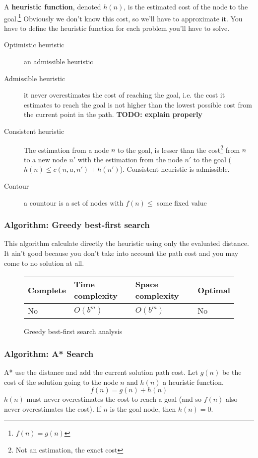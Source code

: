 A \textbf{heuristic function}, denoted $h(n)$, is the estimated cost of the node to the goal.\footnote{$f(n)=g(n)$} Obviously we don't know this cost, so we'll have to approximate it. You have to define the heuristic function for each problem you'll have to solve. 

\begin{description}
\item[Optimistic heuristic] an admissible heuristic
\item[Admissible heuristic] it never overestimates the cost of reaching the goal, i.e. the cost it estimates to reach the goal is not higher than the lowest possible cost from the current point in the path.\cite{wikiadmheur} \textbf{TODO: explain properly}
\item[Consistent heuristic] The estimation from a node $n$ to the goal, is lesser than the cost\footnote{Not an estimation, the exact cost} from $n$ to a new node $n'$ with the estimation from the node $n'$ to the goal ($h(n) \leq c(n,a,n')+h(n')$).
    Consistent heuristic is admissible.
\item[Contour] a countour is a set of nodes with $f(n) \leq$ some fixed value
\end{description}

\subsubsection{Algorithm: Greedy best-first search}

This algorithm calculate directly the heuristic using only the evaluated distance. It ain't good because you don't take into account the path cost and you may come to no solution at all. 

\begin{figure}[H]
\centering
\begin{tabular}{|llll|}
\hline
\textbf{Complete} & \textbf{Time complexity} & \textbf{Space complexity} & \textbf{Optimal} \\
\hline
No& $O(b^m)$ & $O(b^m)$ & No\\
\hline
\end{tabular}
\caption{Greedy best-first search analysis}
\end{figure}

\subsubsection{Algorithm: A* Search}

A* use the distance and add the current solution path cost. Let $g(n)$ be the cost of the solution going to the node $n$ and $h(n)$ a heuristic function.
$$f(n) = g(n) + h(n)$$
$h(n)$ must never overestimates the cost to reach a goal (and so $f(n)$ also never overestimates the cost). If $n$ is the goal node, then $h(n) = 0$.

